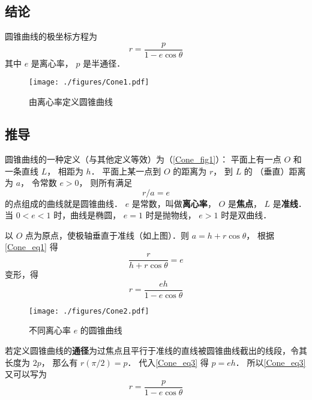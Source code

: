 

\subsection{结论}
圆锥曲线的极坐标方程为
\begin{equation}\label{Cone_eq5}
r  = \frac{p}{1 - e\cos \theta }
\end{equation}
其中 $e$ 是离心率， $p$ 是半通径．

\begin{figure}[ht]
\centering
\texttt{[image: ./figures/Cone1.pdf]}
\caption{由离心率定义圆锥曲线}\label{Cone_fig1}
\end{figure}

\subsection{推导}
圆锥曲线的一种定义（与其他定义等效）为（\autoref{Cone_fig1}）：
平面上有一点 $O$ 和一条直线 $L$， 相距为 $h$． 
平面上某一点到 $O$ 的距离为 $r$， 到 $L$ 的
（垂直）距离为 $a$， 令常数 $e > 0$， 则所有满足
\begin{equation}\label{Cone_eq1}
r/a = e
\end{equation}
的点组成的曲线就是圆锥曲线． $e$ 是常数，叫做\textbf{离心率}， $O$ 是\textbf{焦点}， $L$ 是\textbf{准线}．当 $0 < e < 1$ 时，曲线是椭圆， $e = 1$ 时是抛物线， $e > 1$ 时是双曲线．

以 $O$ 点为原点，使极轴垂直于准线（如上图）．则 $a = h + r \cos \theta $， 根据\autoref{Cone_eq1} 得
\begin{equation}\label{Cone_eq2}
\frac{r}{h + r \cos \theta } = e
\end{equation}
变形，得
\begin{equation}\label{Cone_eq3}
r = \frac{eh}{1 - e\cos \theta }
\end{equation}

\begin{figure}[ht]
\centering
\texttt{[image: ./figures/Cone2.pdf]}
\caption{不同离心率 $e$ 的圆锥曲线} \label{Cone_fig2}
\end{figure}

若定义圆锥曲线的\textbf{通径}为过焦点且平行于准线的直线被圆锥曲线截出的线段，令其长度为 $2p$， 那么有 $r(\pi /2) = p$． 代入\autoref{Cone_eq3} 得 $p = eh$． 所以\autoref{Cone_eq3} 又可以写为
\begin{equation}\label{Cone_eq4}
r  = \frac{p}{1 - e\cos \theta }
\end{equation}


